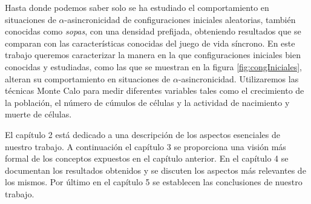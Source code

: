 \documentclass[../proyecto.tex]{book}
\begin{document}
Hasta donde podemos saber solo se ha estudiado el comportamiento en situaciones de $\alpha$-asincronicidad de configuraciones iniciales aleatorias, también conocidas como \textit{sopas}, con una densidad prefijada, obteniendo resultados que se comparan con las características conocidas del juego de vida síncrono. En este trabajo queremos caracterizar la manera en la que configuraciones iniciales bien conocidas y estudiadas, como las que se muestran en la figura \ref{fig:congIniciales}, alteran su comportamiento en situaciones de $\alpha$-asincronicidad. Utilizaremos las técnicas Monte Calo para medir diferentes variables tales como el crecimiento de la población, el número de cúmulos de células y la actividad de nacimiento y muerte de células.

El capítulo 2 está dedicado a una descripción de los aspectos esenciales de nuestro trabajo. A continuación el capítulo 3 se proporciona una visión más formal de los conceptos expuestos en el capítulo anterior. En el capítulo 4 se documentan los resultados obtenidos y se discuten los aspectos más relevantes de los mismos. Por último en el capítulo 5 se establecen las conclusiones de nuestro trabajo. 
\end{document}
